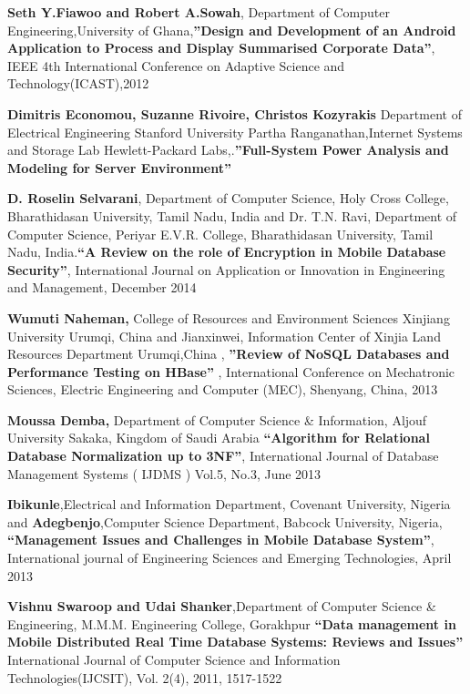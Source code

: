 \documentclass[12pt, a4paper]{article}
\begin{document}
\begin{enumerate}[label={[\arabic*]}]
\item \textbf{Seth Y.Fiawoo and Robert A.Sowah}, Department of Computer Engineering,University  of Ghana,\textbf{”Design and Development of an Android Application to Process and Display Summarised   Corporate Data”},  IEEE  4th International Conference on Adaptive Science and Technology(ICAST),2012
\item \textbf{Dimitris Economou, Suzanne Rivoire, Christos Kozyrakis} Department of Electrical Engineering Stanford University Partha Ranganathan,Internet Systems and Storage Lab Hewlett-Packard Labs,.\textbf{”Full-System Power Analysis and Modeling for Server Environment”}
\item \textbf{D. Roselin Selvarani},  Department of Computer Science, Holy    Cross College, Bharathidasan University, Tamil Nadu, India and  Dr. T.N. Ravi, Department of Computer Science, Periyar    E.V.R. College, Bharathidasan University,  Tamil Nadu, India.\textbf{“A Review on the role of Encryption in Mobile Database Security”}, International Journal on Application or Innovation  in Engineering and Management, December 2014
\item \textbf{Wumuti Naheman,} College of Resources and Environment Sciences Xinjiang University Urumqi, China and Jianxinwei,  Information Center of Xinjia Land Resources Department Urumqi,China , \textbf{ ”Review of NoSQL Databases and Performance Testing on HBase” }, International Conference on Mechatronic Sciences, Electric Engineering and Computer (MEC), Shenyang, China, 2013
\item \textbf{Moussa Demba,} Department of Computer Science \& Information, Aljouf University Sakaka, Kingdom of Saudi Arabia \textbf{“Algorithm for Relational Database Normalization up to 3NF”}, International Journal of Database Management Systems ( IJDMS ) Vol.5, No.3, June 2013
\item \textbf{Ibikunle},Electrical and Information Department, Covenant University, Nigeria and \textbf{Adegbenjo},Computer Science Department, Babcock University, Nigeria,
\textbf{“Management Issues and Challenges in Mobile Database System”}, International journal of Engineering Sciences and Emerging Technologies, April 2013
\item \textbf{Vishnu Swaroop and Udai Shanker},Department of Computer Science \& Engineering, M.M.M. Engineering College, Gorakhpur
\textbf{“Data management in Mobile Distributed Real Time Database Systems: Reviews and Issues”}
 International Journal of Computer Science and Information Technologies(IJCSIT), Vol. 2(4),   2011, 1517-1522

\end{enumerate}
\end{document}
